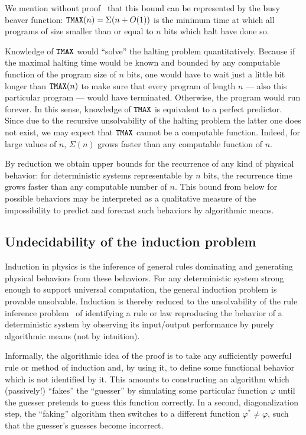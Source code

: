 \documentclass[rmp,amsfonts,showpacs,showkeys,twocolumn]{revtex4}
\begin{document}
We mention without proof~\cite{chaitin-ACM,chaitin-bb}  that
this bound can be represented by the busy beaver function:
${\tt TMAX}(n)=\Sigma (n+O(1))$ is the minimum time at which all
programs of size smaller than or equal to $n$ bits which halt have done so.

Knowledge of ${\tt TMAX}$ would ``solve'' the halting
problem quantitatively.
Because if the maximal halting time would be known
and bounded by any computable function of the program size of $n$ bits,
one would have to wait
just a little bit longer than ${\tt TMAX}(n)$ to make sure
that every program of length $n$ --- also this particular program ---
would have terminated.
Otherwise, the program would run forever.
In this sense, knowledge of ${\tt TMAX}$ is equivalent to  a
perfect predictor.
Since due to the recursive unsolvability of the halting problem the latter one does not exist,
we may expect that ${\tt TMAX}$ cannot be a computable function.
Indeed, for large values of $n$, $\Sigma (n)$
grows faster than any computable function  of $n$.


By reduction we obtain upper bounds for the recurrence of any kind of physical behavior:
for deterministic systems representable by $n$ bits,
the recurrence time grows faster than any computable number
of $n$.
This bound from below for possible behaviors may be interpreted as a qualitative measure
of the impossibility to predict and forecast such behaviors by algorithmic means.


\subsection{Undecidability of the induction problem}

Induction in physics is the inference of general rules
dominating and generating physical behaviors from these behaviors.
For any deterministic system strong enough to support
universal computation, the general induction problem
is provable unsolvable.
Induction is thereby reduced to the unsolvability of
the rule inference problem~\cite{go-67,blum75blum,angluin:83,ad-91,li:92}
of identifying a rule or law reproducing the behavior of a deterministic system
by observing its input/output performance by purely algorithmic means
(not by intuition).

Informally, the algorithmic idea of the proof is to take any sufficiently powerful
rule or method of induction and, by using it, to define some
functional behavior which is not identified by it.
This amounts
to constructing an algorithm which
(passively!)
 ``fakes'' the ``guesser'' by simulating some particular function $\varphi $
until the guesser
pretends to guess this function correctly.
In a second,  diagonalization step, the ``faking'' algorithm then switches to a different
 function $\varphi^\ast  \neq \varphi $, such that the guesser's guesses become incorrect.
\end{document}
